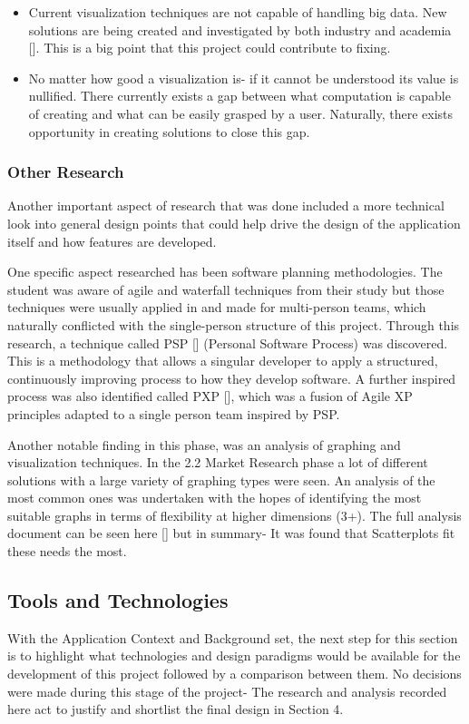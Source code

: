 \begin{itemize}
    \item Current visualization techniques are not capable of handling big data. New solutions are being created and investigated by both industry and academia []. This is a big point that this project could contribute to fixing.
    \item No matter how good a visualization is- if it cannot be understood its value is nullified. There currently exists a gap between what computation is capable of creating and what can be easily grasped by a user. Naturally, there exists opportunity in creating solutions to close this gap.
\end{itemize}

\subsubsection{Other Research}
Another important aspect of research that was done included a more technical look into general design points that could help drive the design of the application itself and how features are developed.

One specific aspect researched has been software planning methodologies. The student was aware of agile and waterfall techniques from their study but those techniques were usually applied in and made for multi-person teams, which naturally conflicted with the single-person structure of this project. Through this research, a technique called PSP [] (Personal Software Process) was discovered. This is a methodology that allows a singular developer to apply a structured, continuously improving process to how they develop software. A further inspired process was also identified called PXP [], which was a fusion of Agile XP principles adapted to a single person team inspired by PSP.

Another notable finding in this phase, was an analysis of graphing and visualization techniques. In the 2.2 Market Research phase a lot of different solutions with a large variety of graphing types were seen. An analysis of the most common ones was undertaken with the hopes of identifying the most suitable graphs in terms of flexibility at higher dimensions (3+). The full analysis document can be seen here [] but in summary- It was found that Scatterplots fit these needs the most.

\subsection{Tools and Technologies} \label{toolsntech}
With the Application Context and Background set, the next step for this section is to highlight what technologies and design paradigms would be available for the development of this project followed by a comparison between them. No decisions were made during this stage of the project- The research and analysis recorded here act to justify and shortlist the final design in Section 4.

